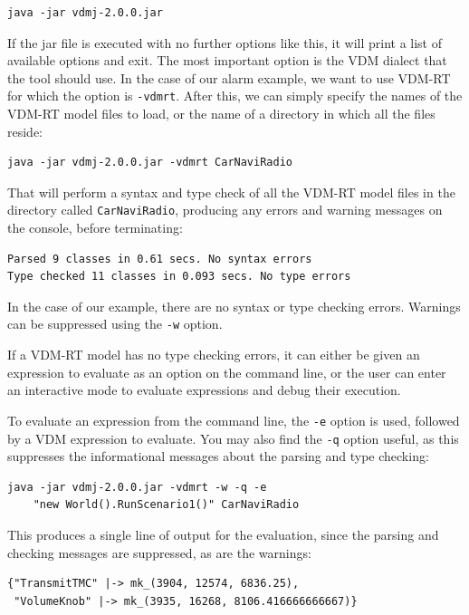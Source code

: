 \lstset{style=tool,language=}
\begin{lstlisting}
java -jar vdmj-2.0.0.jar
\end{lstlisting}

\noindent If the jar file is executed with no further options like this, it will
print a list of available options and exit. The most important option is the VDM
dialect that the tool should use. In the case of our alarm example, we want to
use VDM-RT for which the option is \verb|-vdmrt|. After this, we can simply
specify the names of the VDM-RT model files to load, or the name of a directory
in which all the files reside:

\begin{lstlisting}
java -jar vdmj-2.0.0.jar -vdmrt CarNaviRadio
\end{lstlisting}

\noindent That will perform a syntax and type check of all the VDM-RT model
files in the directory called \verb|CarNaviRadio|, producing any errors and warning
messages on the console, before terminating:

\begin{lstlisting}
Parsed 9 classes in 0.61 secs. No syntax errors
Type checked 11 classes in 0.093 secs. No type errors
\end{lstlisting}

\noindent In the case of our example, there are no syntax or type checking
errors. Warnings can be suppressed using the \verb|-w| option.

If a VDM-RT model has no type checking errors, it can either be given an
expression to evaluate as an option on the command line, or the user can enter
an interactive mode to evaluate expressions and debug their execution.

To evaluate an expression from the command line, the \verb|-e| option is used,
followed by a VDM expression to evaluate. You may also find the \verb|-q|
option useful, as this suppresses the informational messages about the parsing
and type checking:

\begin{lstlisting}
java -jar vdmj-2.0.0.jar -vdmrt -w -q -e 
    "new World().RunScenario1()" CarNaviRadio
\end{lstlisting}

\noindent This produces a single line of output for the evaluation, since the
parsing and checking messages are suppressed, as are the warnings:

\begin{lstlisting}
{"TransmitTMC" |-> mk_(3904, 12574, 6836.25),
 "VolumeKnob" |-> mk_(3935, 16268, 8106.416666666667)}
\end{lstlisting}


